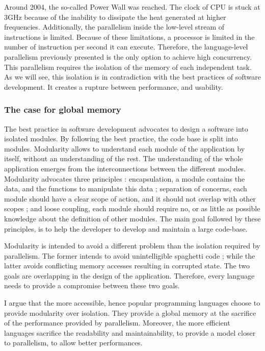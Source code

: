 Around 2004, the so-called Power Wall was reached.
The clock of CPU is stuck at 3GHz because of the inability to dissipate the heat generated at higher frequencies.
Additionally, the parallelism inside the low-level stream of instructions is limited.
Because of these limitations, a processor is limited in the number of instruction per second it can execute.
Therefore, the language-level parallelism previously presented is the only option to achieve high concurrency.
This parallelism requires the isolation of the memory of each independent task.
As we will see, this isolation is in contradiction with the best practices of software development.
It creates a rupture between performance, and usability.

\subsubsection{The case for global memory}

The best practice in software development advocates to design a software into isolated modules.
By following the best practice, the code base is split into modules.
Modularity allows to understand each module of the application by itself, without an understanding of the rest.
The understanding of the whole application emerges from the interconnections between the different modules.
Modularity advocates three principles : encapsulation, a module contains the data, and the functions to manipulate this data ; separation of concerns, each module should have a clear scope of action, and it should not overlap with other scopes ; and loose coupling, each module should require no, or as little as possible knowledge about the definition of other modules.
The main goal followed by these principles, is to help the developer to develop and maintain a large code-base.

Modularity is intended to avoid a different problem than the isolation required by parallelism.
The former intends to avoid unintelligible spaghetti code ; while the latter avoids conflicting memory accesses resulting in corrupted state.
The two goals are overlapping in the design of the application.
Therefore, every language needs to provide a compromise between these two goals.

I argue that the more accessible, hence popular programming languages choose to provide modularity over isolation.
They provide a global memory at the sacrifice of the performance provided by parallelism.
Moreover, the more efficient languages sacrifice the readability and maintainability, to provide a model closer to parallelism, to allow better performances.

